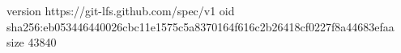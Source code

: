 version https://git-lfs.github.com/spec/v1
oid sha256:eb053446440026cbc11e1575c5a8370164f616c2b26418cf0227f8a44683efaa
size 43840
